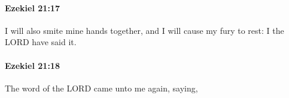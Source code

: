 		\paragraph{Ezekiel 21:17} %
			\label{EZEKIEL-21-17}

			I will also smite mine hands together, and I will cause my fury to rest: I the LORD have said it.


		\paragraph{Ezekiel 21:18} %
			\label{EZEKIEL-21-18}

			The word of the LORD came unto me again, saying,


